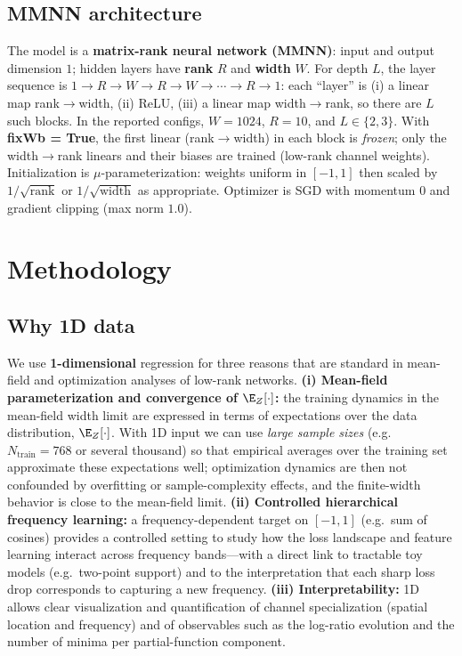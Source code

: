 \documentclass{article}
\begin{document}
\subsection{MMNN architecture}
The model is a \textbf{matrix-rank neural network (MMNN)}: input and output dimension $1$; hidden layers have \textbf{rank} $R$ and \textbf{width} $W$. For depth $L$, the layer sequence is $1 \to R \to W \to R \to W \to \cdots \to R \to 1$: each ``layer'' is (i) a linear map rank$\to$width, (ii) ReLU, (iii) a linear map width$\to$rank, so there are $L$ such blocks. In the reported configs, $W = 1024$, $R = 10$, and $L \in \{2, 3\}$. With \textbf{fixWb = True}, the first linear (rank$\to$width) in each block is \emph{frozen}; only the width$\to$rank linears and their biases are trained (low-rank channel weights). Initialization is $\mu$-parameterization: weights uniform in $[-1,1]$ then scaled by $1/\sqrt{\mathrm{rank}}$ or $1/\sqrt{\mathrm{width}}$ as appropriate. Optimizer is SGD with momentum $0$ and gradient clipping (max norm $1.0$).

\section{Methodology}
\label{sec:methodology}

\subsection{Why 1D data}
We use \textbf{1-dimensional} regression for three reasons that are standard in mean-field and optimization analyses of low-rank networks. \textbf{(i) Mean-field parameterization and convergence of $\E_Z[\cdot]$:} the training dynamics in the mean-field width limit are expressed in terms of expectations over the data distribution, $\E_Z[\cdot]$. With 1D input we can use \emph{large sample sizes} (e.g.\ $N_{\mathrm{train}} = 768$ or several thousand) so that empirical averages over the training set approximate these expectations well; optimization dynamics are then not confounded by overfitting or sample-complexity effects, and the finite-width behavior is close to the mean-field limit. \textbf{(ii) Controlled hierarchical frequency learning:} a frequency-dependent target on $[-1,1]$ (e.g.\ sum of cosines) provides a controlled setting to study how the loss landscape and feature learning interact across frequency bands---with a direct link to tractable toy models (e.g.\ two-point support) and to the interpretation that each sharp loss drop corresponds to capturing a new frequency. \textbf{(iii) Interpretability:} 1D allows clear visualization and quantification of channel specialization (spatial location and frequency) and of observables such as the log-ratio evolution and the number of minima per partial-function component.
\end{document}
